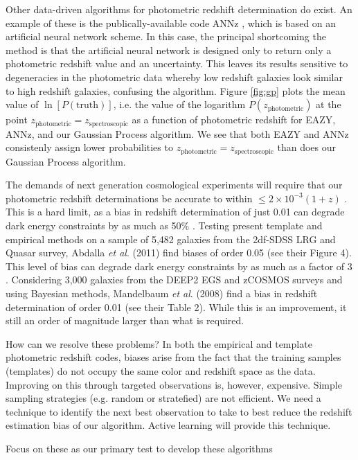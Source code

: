\documentclass[useAMS,usenatbib,tightenlines,11pt,preprint]{aastex}
\begin{document}
Other data-driven algorithms for photometric redshift determination do exist. 
An example of these is the publically-available code ANNz \cite{annz},
which is based on an artificial neural network scheme.
In this case, the principal
shortcoming the method is that the artificial neural network
is designed only to return only a
photometric redshift value and an uncertainty.  This leaves its results
sensitive to degeneracies in the photometric data whereby low redshift galaxies
look similar to high redshift galaxies, confusing the algorithm. 
Figure \ref{fig:gp} plots the mean value of $\ln[P(\text{truth})]$,
i.e. the value of the logarithm $P(z_\text{photometric})$ at the point
$z_\text{photometric}=z_\text{spectroscopic}$ 
as a function
of photometric redshift for EAZY, ANNz, and our Gaussian Process algorithm.
We see that both EAZY and ANNz consistenly assign lower probabilities to
$z_\text{photometric}=z_\text{spectroscopic}$ than does our Gaussian Process algorithm.

The demands of next generation cosmological experiments will require
that our photometric redshift determinations be accurate to within
$\le 2\times 10^{-3}(1+z)$ \cite{desc}.  This is a hard limit, as a
bias in redshift determination of just 0.01 can degrade dark energy
constraints by as much as 50\%
\cite{kitching,huterer2006,nakajima2011}.  Testing present template
and empirical methods on a sample of 5,482 galaxies from the 2df-SDSS
LRG and Quasar survey, Abdalla {\it et al}. (2011) find biases of
order 0.05 (see their Figure 4).  This level of bias can degrade dark
energy constraints by as much as a factor of 3 \cite{Ma2006}.
Considering 3,000 galaxies from the DEEP2 EGS and zCOSMOS surveys and
using Bayesian methods, Mandelbaum {\it et al}.  (2008) find a bias in
redshift determination of order 0.01 (see their Table 2).  While this
is an improvement, it still an order of magnitude larger than what is
required.


How can we resolve these problems?  In both the empirical and template
photometric redshift codes, biases arise from the fact that the
training samples (templates) do not occupy the same color and redshift
space as the data.  Improving on this through targeted observations
is, however, expensive.  Simple sampling strategies (e.g. random or
stratefied) are not efficient.  We need a technique to identify the
next best observation to take to best reduce the redshift estimation
bias of our algorithm.  Active learning will provide this technique.

Focus on these as our primary test to develop these algorithms
\end{document}
